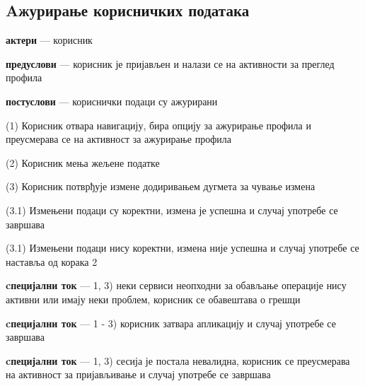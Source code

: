 \documentclass[12pt,oneside]{memoir}
\begin{document}
\subsection{Aжурирање корисничких података}
\begin{description}
    \item \textbf{актери} --- корисник
    \item \textbf{предуслови} --- корисник је пријављен и налази се на активности за преглед профила
    \item \textbf{постуслови} --- кориснички подаци су ажурирани
    \item (1) Корисник отвара навигацију, бира опцију за ажурирање профила и преусмерава се на активност за ажурирање профила
    \item (2) Корисник мења жељене податке
    \item (3) Корисник потврђује измене додиривањем дугмета за чување измена
    \begin{description}
        \item (3.1) Измењени подаци су коректни, измена је успешна и случај употребе се завршава
        \item (3.1) Измењени подаци нису коректни, измена није успешна и случај употребе се наставља од корака 2
    \end{description}
    \item \textbf{cпецијални ток} --- 1, 3) неки сервиси неопходни за обављање операције нису активни или имају неки проблем, корисник се обавештава о грешци
    \item \textbf{cпецијални ток} --- 1 - 3) корисник затвара апликацију и случај употребе се завршава
    \item \textbf{cпецијални ток} --- 1, 3) сесија је постала невалидна, корисник се преусмерава на активност за пријављивање и случај употребе се завршава
\end{description}
\end{document}
